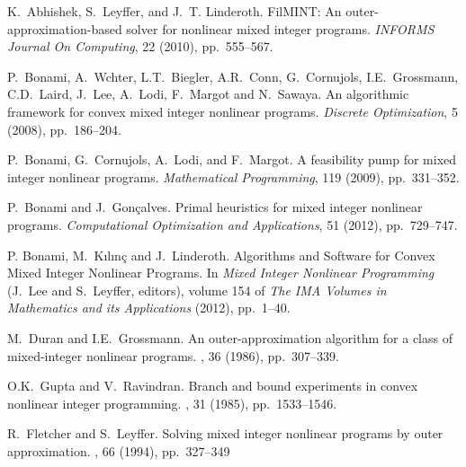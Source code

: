 \begin{PageSummary}
\end{PageSummary}
\begin{thebibliography}{10}

 K.~Abhishek, S.~Leyffer, and J.~T. Linderoth. FilMINT: An
  outer-approximation-based solver for nonlinear mixed integer programs.
  {\em INFORMS Journal On Computing}, 22 (2010), pp.~555--567.

P.~Bonami, A.~W\auml chter, L.T.~Biegler, A.R.~Conn, G.~Cornu\eacute jols,
I.E.~Grossmann, C.D.~Laird, J.~Lee, A.~Lodi, F.~Margot and
N.~Sawaya.
\newblock An algorithmic framework for convex mixed integer nonlinear programs. {\em Discrete Optimization}, 5 (2008), pp.~186--204.
\newblock {}

{P.~Bonami, G.~Cornu\eacute jols, A.~Lodi, and F.~Margot}. {A feasibility
  pump for mixed integer nonlinear programs}. {\em Mathematical Programming}, 119
  (2009), pp.~331--352.

{P.~Bonami and J.~Gon{\c{c}}alves}. {Primal heuristics for mixed
  integer nonlinear programs}. 
  {\em Computational Optimization and Applications}, 51 (2012), pp.~729--747.

P. Bonami, M.~{K{\i}l{\i}n\c{c}} and J.~Linderoth.
Algorithms and Software for Convex Mixed Integer Nonlinear Programs.
In \emph{Mixed Integer Nonlinear Programming} (J.~Lee and S.~Leyffer, editors),
volume 154 of \emph{The IMA Volumes in Mathematics and its Applications} (2012),
pp.~1--40.

M.~Duran and I.E.~Grossmann.
\newblock An outer-approximation algorithm for a class of mixed-integer nonlinear programs.
, 36 (1986), pp.~307--339.
\newblock {}

O.K.~Gupta and V.~Ravindran.
\newblock Branch and bound experiments in convex nonlinear integer programming.
, 31 (1985), pp.~1533--1546.
\newblock {}

R.~Fletcher and S.~Leyffer.
\newblock Solving mixed integer nonlinear programs by outer approximation.
, 66 (1994), pp.~327--349
\newblock {}


\end{thebibliography}
